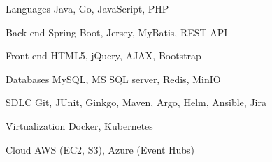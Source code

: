 

\begin{cvskills}

  \cvskill
    {Languages} %
    {Java, Go, JavaScript, PHP} %

  \cvskill
    {Back-end} %
    {Spring Boot, Jersey, MyBatis, REST API} %

  \cvskill
    {Front-end} %
    {HTML5, jQuery, AJAX, Bootstrap} %

  \cvskill
    {Databases} %
    {MySQL, MS SQL server, Redis, MinIO} %

  \cvskill
    {SDLC} %
    {Git, JUnit, Ginkgo, Maven, Argo, Helm, Ansible, Jira} %

  \cvskill
    {Virtualization} %
    {Docker, Kubernetes} %

  \cvskill
    {Cloud} %
    {AWS (EC2, S3), Azure (Event Hubs)} %
\end{cvskills}
